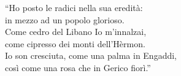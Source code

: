 \spazio


\spazio

\strofa ``Ho posto le radici nella sua eredità:\\
in mezzo ad un popolo glorioso.\\
Come cedro del Libano Io m'innalzai,\\
come cipresso dei monti dell'Hèrmon.\\
Io son cresciuta, come una palma in Engaddi,\\
così come una rosa che in Gerico fiorì.''

\spazio

